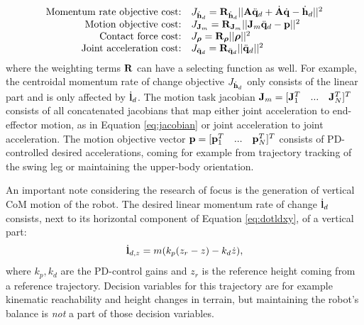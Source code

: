 \begin{equation*}
\begin{array}{rlcl}
$Momentum rate objective cost:$ & J_{\dot{\vect{h}}_d}= \wght_{\dot{\vect{h}}_d}||\matr{A}\ddqjntd + \dot{\matr{A}}\dqjnt - \dot{\vect{h}}_d||^2\\
$Motion objective cost:$ & J_{\matr{J}_m} = \wght_{\matr{J}_m}||\matr{J}_m\ddqjntd-\vect{p}||^2\\
$Contact force cost:$ & J_{\bs{\rho}}=\wght_{\bs{\rho}}||\bs{\rho}||^2 \\
$Joint acceleration cost:$ & J_{\ddqjntd} = \wght_{\ddqjntd}||\ddqjntd ||^2 \\
\end{array}
\end{equation*}
where the weighting terms $\mathbf{R}$ can have a selecting function as well. For example, the centroidal momentum rate of change objective $J_{\dot{\mathbf{h}}_d}$ only consists of the linear part and is only affected by $\dot{\mathbf{l}}_d$. The motion task jacobian $\mathbf{J}_m = [\mathbf{J}_1^T\quad...\quad\mathbf{J}_N^T]^T$ consists of all concatenated jacobians that map either joint acceleration to end-effector motion, as in Equation \eqref{eq:jacobian} or joint acceleration to joint acceleration. The motion objective vector $\mathbf{p} = [\mathbf{p}_1^T\quad...\quad\mathbf{p}_N^T]^T$  consists of PD-controlled desired accelerations, coming for example from trajectory tracking of the swing leg or maintaining the upper-body orientation. %

An important note considering the research of focus is the generation of vertical \ac{CoM} motion of the robot. The desired linear momentum rate of change $\dot{\mathbf{l}}_d$ consists, next to its horizontal component of Equation \eqref{eq:dotldxy}, of a vertical part:
\begin{equation}
\dot{\mathbf{l}}_{d,z} =m(k_p(z_r-z) - k_d\dot{z}), 
\label{eq:defaultheightcontrol}
\end{equation}
where $k_p, k_d$ are the PD-control gains and $z_r$ is the reference height coming from a reference trajectory. Decision variables for this trajectory are for example kinematic reachability and height changes in terrain, but maintaining the robot's balance is \textit{not} a part of those decision variables.


